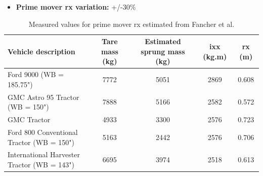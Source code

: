 \begin{itemize}
\item \textbf{Prime mover \gls{rx} variation:} +/-30\%
\end{itemize}

\begin{table}[H]
	\centering\footnotesize
	\begin{threeparttable}

		\begin{tabulary}{\textwidth}{lCCCC}
			\toprule
			\textbf{Vehicle description} & \textbf{Tare mass (kg)} & \textbf{Estimated sprung mass (kg)} & \textbf{\gls{ixx} (kg.m\sstw)} & \textbf{\gls{rx} (m)} \\
			\midrule
			Ford 9000 (WB = 185.75") & 7772  & 5051  & 2869  & 0.608 \\
			GMC Astro 95 Tractor (WB = 150") & 7888  & 5166  & 2582  & 0.572 \\
			GMC Tractor & 4933   & 3300  & 2576  & 0.723 \\
			Ford 800 Conventional Tractor (WB = 150") & 5163     & 2442  & 2576  & 0.706 \\
			International Harvester Tractor (WB = 143") & 6695    & 3974  & 2518  & 0.613 \\
			\bottomrule
		\end{tabulary}

		\caption{Measured values for prime mover \gls{rx} estimated from Fancher et al. \cite{Fancher1986}}
		\label{table:measured-values-for-prime-mover-rx-from-fancher-et-al}


	\end{threeparttable}
\end{table}

